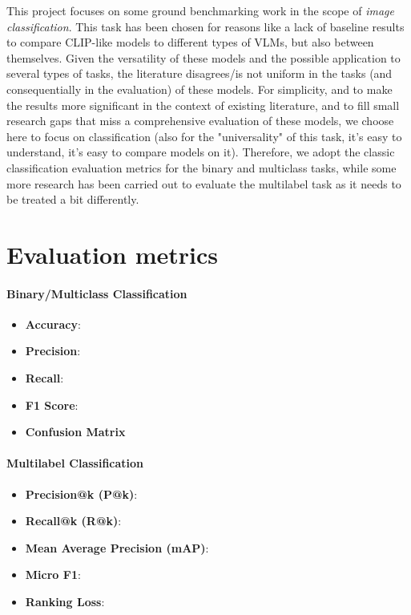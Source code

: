 \documentclass[a4paper, oneside, english]{sapthesis}
\begin{document}
This project focuses on some ground benchmarking work in the scope of \emph{image classification}. This task has been chosen for reasons like a lack of baseline results to compare CLIP-like models to different types of VLMs, but also between themselves. Given the versatility of these models and the possible application to several types of tasks, the literature disagrees/is not uniform in the tasks (and consequentially in the evaluation) of these models. For simplicity, and to make the results more significant in the context of existing literature, and to fill small research gaps that miss a comprehensive evaluation of these models, we choose here to focus on classification (also for the "universality" of this task, it's easy to understand, it's easy to compare models on it). Therefore, we adopt the classic classification evaluation metrics for the binary and multiclass tasks, while some more research has been carried out to evaluate the multilabel task as it needs to be treated a bit differently.

\section{Evaluation metrics}

\paragraph{Binary/Multiclass Classification}

\begin{itemize}
    \item \textbf{Accuracy}:
    \item \textbf{Precision}:
    \item \textbf{Recall}:
    \item \textbf{F1 Score}:
    \item \textbf{Confusion Matrix}
\end{itemize}

\paragraph{Multilabel Classification}

\begin{itemize}
    \item \textbf{Precision@k (P@k)}:
    \item \textbf{Recall@k (R@k)}:
    \item \textbf{Mean Average Precision (mAP)}:
    \item \textbf{Micro F1}:
    \item \textbf{Ranking Loss}:
\end{itemize}
\end{document}
